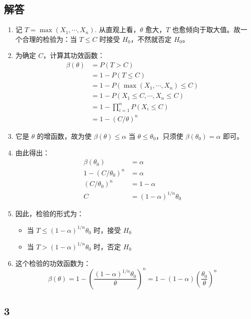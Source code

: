 \documentclass[UTF8]{report}
\theoremstyle{MyLineTheoremStyle} %
\theoremstyle{MyBlockTheoremStyle} %
\theoremstyle{MySubsubsectionStyle} %
\begin{document}
\subsection*{解答}
\begin{enumerate}
\item 记 $T=\max(X_1,\cdots,X_n)$. 从直观上看，$\theta$ 愈大，$T$ 也愈倾向于取大值。故一个合理的检验为：当 $T\leqslant C$ 时接受 $H_0$，不然就否定 $H_0$。

\item 为确定 $C$，计算其功效函数：
\begin{align*}
\beta(\theta) &= P(T > C) \\
&= 1 - P(T \leq C) \\
&= 1 - P(\max(X_1,\cdots,X_n) \leq C) \\
&= 1 - P(X_1 \leq C, \cdots, X_n \leq C) \\
&= 1 - \prod_{i=1}^n P(X_i \leq C) \\
&= 1 - (C/\theta)^n
\end{align*}

\item 它是 $\theta$ 的增函数，故为使 $\beta(\theta)\leqslant\alpha$ 当 $\theta\leqslant\theta_0$，只须使 $\beta(\theta_0)=\alpha$ 即可。

\item 由此得出：
\begin{align*}
\beta(\theta_0) &= \alpha \\
1 - (C/\theta_0)^n &= \alpha \\
(C/\theta_0)^n &= 1-\alpha \\
C &= (1-\alpha)^{1/n}\theta_0
\end{align*}

\item 因此，检验的形式为：
\begin{itemize}
\item 当 $T \leq (1-\alpha)^{1/n}\theta_0$ 时，接受 $H_0$
\item 当 $T > (1-\alpha)^{1/n}\theta_0$ 时，否定 $H_0$
\end{itemize}

\item 这个检验的功效函数为：
$$\beta(\theta) = 1 - \left(\frac{(1-\alpha)^{1/n}\theta_0}{\theta}\right)^n = 1 - (1-\alpha)\left(\frac{\theta_0}{\theta}\right)^n$$
\end{enumerate}


\subsection{3}
\end{document}
